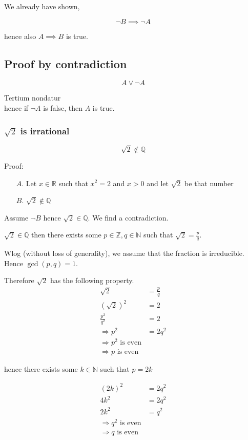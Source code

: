 \documentclass[a4paper,landscape,twocolumn]{article}
\begin{document}
We already have shown,

\[ \neg B \implies \neg A \]

hence also $A \implies B$ is true.

\subsection{Proof by contradiction}

\[ A \lor \neg A \]

Tertium nondatur \\
hence if $\neg A$ is false, then $A$ is true.

\subsubsection{$\sqrt{2}$ is irrational}

\[ \sqrt{2} \not\in \mathbb{Q} \]

Proof:

\begin{itemize}
  \item[$A$.] Let $x \in \mathbb{R}$ such that $x^2 = 2$ and $x > 0$ and let $\sqrt{2}$ be that number
  \item[$B$.] $\sqrt{2} \not\in \mathbb{Q}$
\end{itemize}

Assume $\neg B$ hence $\sqrt{2} \in \mathbb{Q}$. We find a contradiction.

$\sqrt{2} \in \mathbb{Q}$ then there exists some $p \in \mathbb{Z}, q \in \mathbb{N}$ such that $\sqrt{2} = \frac{p}{q}$.

Wlog (without loss of generality), we assume that the fraction is irreducible. Hence $\operatorname{gcd}(p, q) = 1$.

Therefore $\sqrt{2}$ has the following property.
\begin{align*}
  \sqrt{2} &= \frac{p}{q} \\
  (\sqrt{2})^2 &= 2 \\
  \frac{p^2}{q^2} &= 2 \\
  \Rightarrow p^2 &= 2 q^2 \\
  \Rightarrow p^2 \text{ is even} \\
  \Rightarrow p \text { is even }
\end{align*}

hence there exists some $k \in \mathbb{N}$ such that $p = 2k$

\begin{align*}
  (2k)^2 &= 2q^2 \\
  4k^2 &= 2q^2 \\
  2k^2 &= q^2 \\
  \Rightarrow q^2 \text{ is even} \\
  \Rightarrow q \text{ is even} \\
\end{align*}
\end{document}

